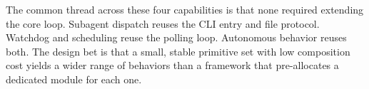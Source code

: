 \medskip
\noindent
The common thread across these four capabilities is that none required extending the core loop. Subagent dispatch reuses the CLI entry and file protocol. Watchdog and scheduling reuse the polling loop. Autonomous behavior reuses both. The design bet is that a small, stable primitive set with low composition cost yields a wider range of behaviors than a framework that pre-allocates a dedicated module for each one.